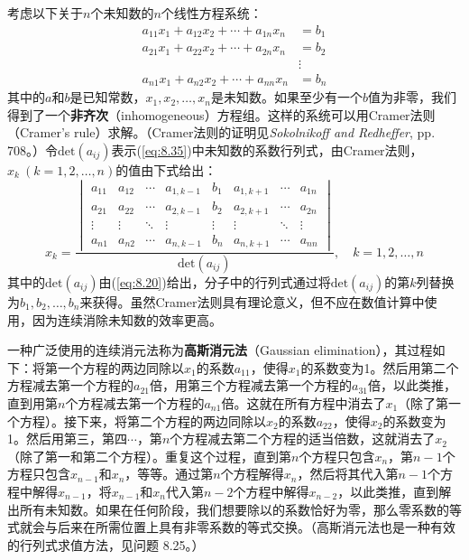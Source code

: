    考虑以下关于$n$个未知数的$n$个线性方程系统：
    \begin{equation}
        \begin{aligned}
            a_{11}x_1 + a_{12}x_2 + \cdots + a_{1n}x_n &= b_1 \\
            a_{21}x_1 + a_{22}x_2 + \cdots + a_{2n}x_n &= b_2 \\
            &\vdots \\
            a_{n1}x_1 + a_{n2}x_2 + \cdots + a_{nn}x_n &= b_n
        \end{aligned}
        \label{eq:8.35}
    \end{equation}
    其中的$a$和$b$是已知常数，$x_1,x_2,\ldots,x_n$是未知数。如果至少有一个$b$值为非零，我们得到了一个\textbf{非齐次}（inhomogeneous）方程组。这样的系统可以用Cramer法则（Cramer's rule）求解。（Cramer法则的证明见\textit{Sokolnikoff and Redheffer}, pp. 708。）令$\mathrm{det}\left(a_{ij}\right)$表示(\ref{eq:8.35})中未知数的系数行列式，由Cramer法则，$x_k \: \left(k = 1,2,\ldots,n\right)$的值由下式给出：
    \begin{equation}
        x_k = \frac{
            \begin{vmatrix}
                a_{11} & a_{12} & \cdots & a_{1,k-1} & b_1 & a_{1,k+1} & \cdots & a_{1n} \\
                a_{21} & a_{22} & \cdots & a_{2,k-1} & b_2 & a_{2,k+1} & \cdots & a_{2n} \\
                \vdots & \vdots & \ddots & \vdots & \vdots & \vdots & \ddots & \vdots \\
                a_{n1} & a_{n2} & \cdots & a_{n,k-1} & b_n & a_{n,k+1} & \cdots & a_{nn}
            \end{vmatrix}
        }{\mathrm{det}\left(a_{ij}\right)}, \quad k = 1,2,\ldots,n
        \label{eq:8.36}
    \end{equation}
    其中的$\mathrm{det}\left(a_{ij}\right)$由(\ref{eq:8.20})给出，分子中的行列式通过将$\mathrm{det}\left(a_{ij}\right)$的第$k$列替换为$b_1,b_2,\ldots,b_n$来获得。虽然Cramer法则具有理论意义，但不应在数值计算中使用，因为连续消除未知数的效率更高。

    一种广泛使用的连续消元法称为\textbf{高斯消元法}（Gaussian elimination），其过程如下：将第一个方程的两边同除以$x_1$的系数$a_{11}$，使得$x_1$的系数变为1。然后用第二个方程减去第一个方程的$a_{21}$倍，用第三个方程减去第一个方程的$a_{31}$倍，以此类推，直到用第$n$个方程减去第一个方程的$a_{n1}$倍。这就在所有方程中消去了$x_1$（除了第一个方程）。接下来，将第二个方程的两边同除以$x_2$的系数$a_{22}$，使得$x_2$的系数变为1。然后用第三，第四$\cdots$，第$n$个方程减去第二个方程的适当倍数，这就消去了$x_2$（除了第一和第二个方程）。重复这个过程，直到第$n$个方程只包含$x_n$，第$n-1$个方程只包含$x_{n-1}$和$x_n$，等等。通过第$n$个方程解得$x_n$，然后将其代入第$n-1$个方程中解得$x_{n-1}$，将$x_{n-1}$和$x_n$代入第$n-2$个方程中解得$x_{n-2}$，以此类推，直到解出所有未知数。如果在任何阶段，我们想要除以的系数恰好为零，那么零系数的等式就会与后来在所需位置上具有非零系数的等式交换。（高斯消元法也是一种有效的行列式求值方法，见问题 8.25。）

